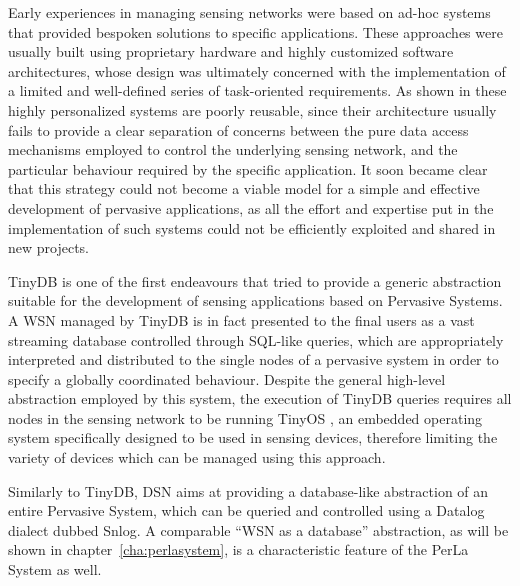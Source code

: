 Early experiences in managing sensing networks were based on ad-hoc systems
that provided bespoken solutions to specific applications. These approaches
were usually built using proprietary hardware and highly customized software
architectures, whose design was ultimately concerned with the implementation of
a limited and well-defined series of task-oriented requirements. As shown in
\cite{hartung2006firewxnet} \cite{mainwaring2002wireless}
\cite{werner2005monitoring} \cite{juang2002energy} these highly personalized
systems are poorly reusable, since their architecture usually fails to provide
a clear separation of concerns between the pure data access mechanisms employed
to control the underlying sensing network, and the particular behaviour
required by the specific application. It soon became clear that this strategy
could not become a viable model for a simple and effective development of
pervasive applications, as all the effort and expertise put in the
implementation of such systems could not be efficiently exploited and shared in
new projects.

TinyDB \cite{madden2005tinydb} is one of the first endeavours that tried to
provide a generic abstraction suitable for the development of sensing
applications based on Pervasive Systems. A WSN managed by TinyDB is in fact
presented to the final users as a vast streaming database controlled through
SQL-like queries, which are appropriately interpreted and distributed to the
single nodes of a pervasive system in order to specify a globally coordinated
behaviour. Despite the general high-level abstraction employed by this system,
the execution of TinyDB queries requires all nodes in the sensing network to be
running TinyOS \cite{levis2005tinyos}, an embedded operating system
specifically designed to be used in sensing devices, therefore limiting the
variety of devices which can be managed using this approach.

Similarly to TinyDB, DSN \cite{chu2006entirely} aims at providing a
database-like abstraction of an entire Pervasive System, which can be queried
and controlled using a Datalog dialect dubbed Snlog. A comparable ``WSN as a
database'' abstraction, as will be shown in chapter~\ref{cha:perlasystem}, is a
characteristic feature of the PerLa System as well.

